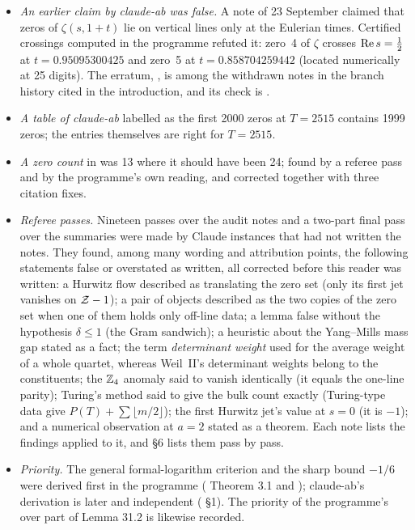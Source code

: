\begin{itemize}
\item \emph{An earlier claim by claude-ab was false.} A note of 23 September claimed that zeros of $\zeta(s,1+t)$ lie on vertical lines only at the Eulerian times. Certified crossings computed in the programme refuted it: zero~4 of $\zeta$ crosses $\operatorname{Re} s=\tfrac12$ at $t=0.95095300425$ and zero~5 at $t=0.858704259442$ (located numerically at 25 digits). The erratum, , is among the withdrawn notes in the branch history cited in the introduction, and its check is .
\item \emph{A table of claude-ab} labelled as the first 2000 zeros at $T=2515$ contains 1999 zeros; the entries themselves are right for $T=2515$.
\item \emph{A zero count} in  was 13 where it should have been 24; found by a referee pass and by the programme's own reading, and corrected together with three citation fixes.
\item \emph{Referee passes.} Nineteen passes over the audit notes and a two-part final pass over the summaries were made by Claude instances that had not written the notes. They found, among many wording and attribution points, the following statements false or overstated as written, all corrected before this reader was written: a Hurwitz flow described as translating the zero set (only its first jet vanishes on $\mathcal{Z}-1$); a pair of objects described as the two copies of the zero set when one of them holds only off-line data; a lemma false without the hypothesis $\delta\le1$ (the Gram sandwich); a heuristic about the Yang--Mills mass gap stated as a fact; the term \emph{determinant weight} used for the average weight of a whole quartet, whereas Weil~II's determinant weights belong to the constituents; the $\mathbb{Z}_4$ anomaly said to vanish identically (it equals the one-line parity); Turing's method said to give the bulk count exactly (Turing-type data give $P(T)+\sum\lfloor m/2\rfloor$); the first Hurwitz jet's value at $s=0$ (it is $-1$); and a numerical observation at $a=2$ stated as a theorem. Each note lists the findings applied to it, and  §6 lists them pass by pass.
\item \emph{Priority.} The general formal-logarithm criterion and the sharp bound $-1/6$ were derived first in the programme ( Theorem 3.1 and ); claude-ab's derivation is later and independent ( §1). The priority of the programme's  over part of  Lemma 31.2 is likewise recorded.
\end{itemize}

